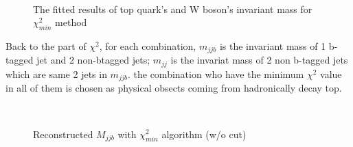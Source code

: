 			\begin{figure}[H]
			\centering
			    \\
			\caption{The fitted results of top quark's and W boson's invariant mass for $\chi^2_{min}$ method}
			\label{EventSelReco:fig:fitted_mass}
			\end{figure}
			\FloatBarrier


			Back to the part of $\chi^2$, for each combination, $m_{jjb}$ is the invariant mass of 1 b-tagged jet and 2 non-btagged jets; $m_{jj}$ is the invariat mass of 2 non b-tagged jets which are same 2 jets in $m_{jjb}$. the combination who have the minimum ${\chi}^{2}$ value in all of them is chosen as physical obsects coming from hadronically decay top.


\begin{figure}[H]
\centering
    \\
\caption{Reconstructed $M_{jjb}$ with $\chi^2_{min}$ algorithm (w/o cut)}
\label{EventSelReco:fig:chi2_SR_NC_Mjjb}
\end{figure}
\FloatBarrier

